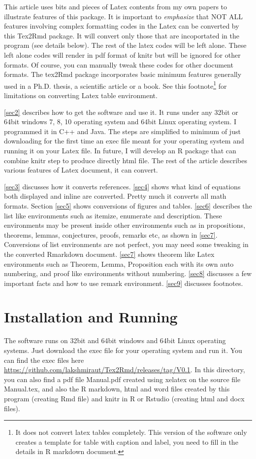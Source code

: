 \documentclass[12pt,svgnames]{article}
\begin{document}
This article uses bits and pieces of Latex contents from my own papers to illustrate features of this package. It is important to \emph{emphasize} that NOT ALL features involving complex formatting codes in the Latex can be converted by this Tex2Rmd package. It will convert only those that are incoportated in the program (see details below). The rest of the latex codes will be left alone.  These left alone codes will render in pdf format of knitr but will be ignored for other formats. Of course, you can manually tweak these codes for other document formats.  The tex2Rmd package incorporates basic minimum features generally used in a Ph.D. thesis, a scientific article or a book. See this footnote\footnote{%
It does not convert latex tables completely. This version of the software only creates a template for table with caption and label, you need to fill in the details in R markdown document.} for limitations on converting Latex table environment.

\autoref{sec2} describes how to get the software and use it. It runs under any 32bit or 64bit windows 7, 8, 10 operating system and 64bit Linux operating system. I programmed it in C++ and Java.  The steps are simplified to minimum of just downloading for the first time an exec file meant for your operating system and running it on your Latex file. In future, I will develop an R package that can combine knitr step to produce directly html file. The rest of the article describes various features of Latex document, it can convert. 
 
\autoref{sec3} discusses how it converts references. \autoref{sec4} shows what kind of equations both displayed and inline are converted. Pretty much it converts all math formats. Section \ref{sec5} shows conversions of figures and tables. \autoref{sec6} describes the list like environments such as itemize, enumerate and description. These environments may be present inside other environments such as in propositions, theorems, lemmas, conjectures, proofs, remarks etc, as shown in \autoref{sec7}. Conversions of list environments are not perfect, you may need some tweaking in the converted Rmarkdown document. \autoref{sec7} shows theorem like Latex environments such as Theorem, Lemma, Proposition each with its own auto numbering, and proof like environments without numbering. \autoref{sec8} discusses a few important facts and how to use  remark environment. \autoref{sec9} discusses footnotes. 

\section{Installation and Running}\label{sec2}
The software runs on 32bit and 64bit windows and 64bit Linux operating systems.  Just download the exec file for your operating system and run it. You can find the exec files here \url{https://github.com/lakshmiraut/Tex2Rmd/releases/tag/V0.1}. In this directory, you can also find a pdf file Manual.pdf created using xelatex on the source file Manual.tex, and also the R markdown, html and word files created by this program (creating Rmd file) and knitr in R or Rstudio (creating html and docx files).
\end{document}
